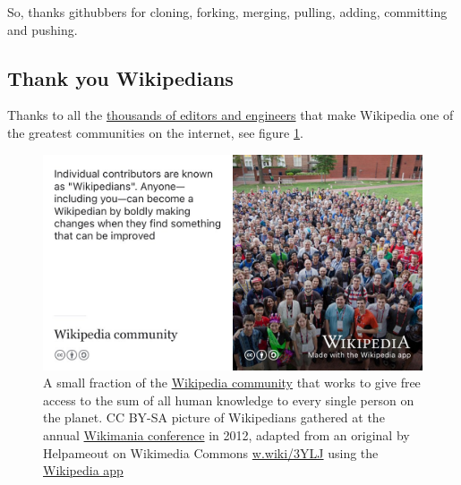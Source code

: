 \documentclass[
]{book}
\begin{document}
So, thanks githubbers for cloning, forking, merging, pulling, adding, committing and pushing. 🙏

\hypertarget{wikipedians}{%
\subsection{Thank you Wikipedians}\label{wikipedians}}

Thanks to all the \href{https://en.wikipedia.org/wiki/Wikipedia:Wikipedians}{thousands of editors and engineers} that make Wikipedia one of the greatest communities on the internet, see figure \ref{fig:wikipedians-fig}.

\begin{figure}

{\centering \includegraphics[width=0.99\linewidth]{images/wikipedians} 

}

\caption{A small fraction of the \href{https://en.wikipedia.org/wiki/Wikipedia_community}{Wikipedia community} that works to give free access to the sum of all human knowledge to every single person on the planet. CC BY-SA picture of Wikipedians gathered at the annual \href{https://en.wikipedia.org/wiki/Wikimania}{Wikimania conference} in 2012, adapted from an original by Helpameout on Wikimedia Commons \href{https://w.wiki/3YLJ}{w.wiki/3YLJ} using the \href{https://apps.apple.com/us/app/wikipedia/id324715238}{Wikipedia app}}\label{fig:wikipedians-fig}
\end{figure}
\end{document}
